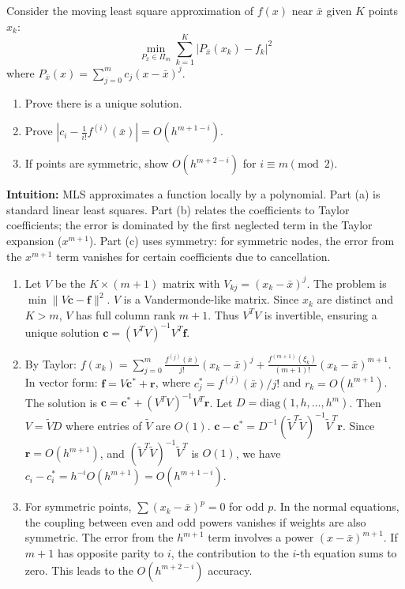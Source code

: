 \begin{exercise}
\label{applied:2012:2}
Consider the moving least square approximation of $f(x)$ near $\bar{x}$ given $K$ points $x_k$:
\[
\min_{P_{\bar{x}}\in\Pi_{m}}\sum_{k=1}^{K}|P_{\bar{x}}(x_{k})-f_{k}|^{2}
\]
where $P_{\bar{x}}(x)=\sum_{j=0}^m c_j (x-\bar{x})^j$.

\begin{enumerate}
\item[(a)] Prove there is a unique solution.
\item[(b)] Prove $|c_{i}-\frac{1}{i!}f^{(i)}(\bar{x})|=O(h^{m+1-i})$.
\item[(c)] If points are symmetric, show $O(h^{m+2-i})$ for $i \equiv m \pmod{2}$.
\end{enumerate}
\end{exercise}

\begin{solution}
\textbf{Intuition:} MLS approximates a function locally by a polynomial. Part (a) is standard linear least squares. Part (b) relates the coefficients to Taylor coefficients; the error is dominated by the first neglected term in the Taylor expansion ($x^{m+1}$). Part (c) uses symmetry: for symmetric nodes, the error from the $x^{m+1}$ term vanishes for certain coefficients due to cancellation.

\begin{enumerate}
\item[(a)] Let $V$ be the $K \times (m+1)$ matrix with $V_{kj} = (x_k - \bar{x})^j$. The problem is $\min \|V\mathbf{c} - \mathbf{f}\|^2$. $V$ is a Vandermonde-like matrix. Since $x_k$ are distinct and $K > m$, $V$ has full column rank $m+1$. Thus $V^T V$ is invertible, ensuring a unique solution $\mathbf{c} = (V^T V)^{-1} V^T \mathbf{f}$.

\item[(b)] By Taylor: $f(x_k) = \sum_{j=0}^m \frac{f^{(j)}(\bar{x})}{j!}(x_k - \bar{x})^j + \frac{f^{(m+1)}(\xi_k)}{(m+1)!}(x_k - \bar{x})^{m+1}$.
In vector form: $\mathbf{f} = V \mathbf{c}^* + \mathbf{r}$, where $c^*_j = f^{(j)}(\bar{x})/j!$ and $r_k = O(h^{m+1})$.
The solution is $\mathbf{c} = \mathbf{c}^* + (V^T V)^{-1} V^T \mathbf{r}$.
Let $D = \text{diag}(1, h, \dots, h^m)$. Then $V = \tilde{V} D$ where entries of $\tilde{V}$ are $O(1)$.
$\mathbf{c} - \mathbf{c}^* = D^{-1} (\tilde{V}^T \tilde{V})^{-1} \tilde{V}^T \mathbf{r}$.
Since $\mathbf{r} = O(h^{m+1})$, and $(\tilde{V}^T \tilde{V})^{-1} \tilde{V}^T$ is $O(1)$, we have $c_i - c_i^* = h^{-i} O(h^{m+1}) = O(h^{m+1-i})$.

\item[(c)] For symmetric points, $\sum (x_k - \bar{x})^p = 0$ for odd $p$. In the normal equations, the coupling between even and odd powers vanishes if weights are also symmetric. The error from the $h^{m+1}$ term involves a power $(x-\bar{x})^{m+1}$. If $m+1$ has opposite parity to $i$, the contribution to the $i$-th equation sums to zero. This leads to the $O(h^{m+2-i})$ accuracy.
\end{enumerate}
\end{solution}

